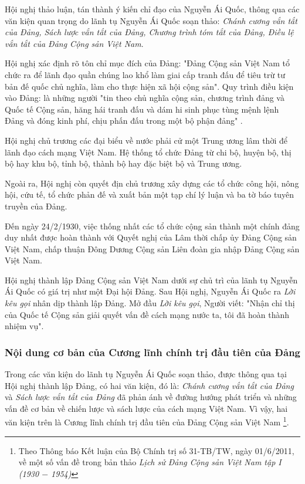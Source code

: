 Hội nghị thảo luận, tán thành ý kiến chỉ đạo của Nguyễn Ái Quốc, thông qua các văn kiện quan trọng do lãnh tụ Nguyễn Ái Quốc soạn thảo: \textit{Chánh cương vắn tắt của Đảng, Sách lược vắn tắt của Đảng, Chương trình tóm tắt của Đảng, Điều lệ vắn tắt của Đảng Cộng sản Việt Nam}.

Hội nghị xác định rõ tôn chỉ mục đích của Đảng: "Đảng Cộng sản Việt Nam tổ chức ra để lãnh đạo quần chúng lao khổ làm giai cấp tranh đấu để tiêu trừ tư bản đế quốc chủ nghĩa, làm cho thực hiện xã hội cộng sản". Quy trình điều kiện vào Đảng: là những người "tin theo chủ nghĩa cộng sản, chương trình đảng và Quốc tế Cộng sản, hăng hái tranh đấu và dám hi sinh phục tùng mệnh lệnh Đảng và đóng kinh phí, chịu phấn đấu trong một bộ phận đảng" .

Hội nghị chủ trương các đại biểu về nước phải cử một Trung ương lâm thời để lãnh đạo cách mạng Việt Nam. Hệ thống tổ chức Đảng từ chi bộ, huyện bộ, thị bộ hay khu bộ, tỉnh bộ, thành bộ hay đặc biệt bộ và Trung ương.

Ngoài ra, Hội nghị còn quyết địn chủ trương xây dựng các tổ chức công hội, nông hội, cứu tế, tổ chức phản đế và xuất bản một tạp chí lý luận và ba tờ báo tuyên truyền của Đảng.

Đến ngày 24/2/1930, việc thống nhất các tổ chức cộng sản thành một chính đảng duy nhất được hoàn thành với Quyết nghị của Lâm thời chấp ủy Đảng Cộng sản Việt Nam, chấp thuận Đông Dương Cộng sản Liên đoàn gia nhập Đảng Cộng sản Việt Nam.

Hội nghị thành lập Đảng Cộng sản Việt Nam dưới sự chủ trì của lãnh tụ Nguyễn Ái Quốc có giá trị như một Đại hội Đảng. Sau Hội nghị, Nguyễn Ái Quốc ra \textit{Lời kêu gọi} nhân dịp thành lập Đảng. Mở đầu \textit{Lời kêu gọi}, Người viết: "Nhận chỉ thị của Quốc tế Cộng sản giải quyết vấn đề cách mạng nước ta, tôi đã hoàn thành nhiệm vụ".

\subsubsection{Nội dung cơ bản của Cương lĩnh chính trị đầu tiên của Đảng}
Trong các văn kiện do lãnh tụ Nguyễn Ái Quốc soạn thảo, được thông qua tại Hội nghị thành lập Đảng, có hai văn kiện, đó là: \textit{Chánh cương vắn tắt của Đảng} và \textit{Sách lược vắn tắt của Đảng}  đã phản ánh về đường hướng phát triển và những vấn đề cơ bản về chiến lược và sách lược của cách mạng Việt Nam. Vì vậy, hai văn kiện trên là Cương lĩnh chính trị đầu tiên của Đảng Cộng sản Việt Nam \footnote{Theo Thông báo Kết luận của Bộ Chính trị số 31-TB/TW, ngày 01/6/2011, về một số vấn đề trong bản thảo \textit{Lịch sử Đảng Cộng sản Việt Nam tập I (1930 $-$ 1954)}}.

